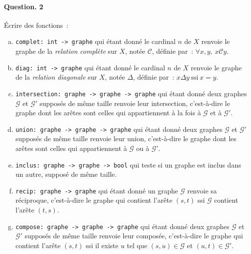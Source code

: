 \documentclass[10pt,a4paper]{article}
\begin{document}
\paragraph{Question. 2\\}
Écrire des fonctions~:
\begin{enumerate}[a)]
\item \texttt{complet: int -> graphe} qui étant donné le cardinal $n$ de $X$
renvoie le graphe de la \textit{relation complète} sur $X$, notée $\mathcal{C}$,
définie par~: $\forall x, y, \ x \mathcal{C} y$.
\item \texttt{diag: int -> graphe} qui étant donné le cardinal $n$ de $X$
renvoie le graphe de la \textit{relation diagonale} sur $X$, notée $\Delta$, 
définie par~: $x \Delta y \ \mathrm{ssi} \ x=y$.
\item \texttt{intersection: graphe -> graphe -> graphe} qui étant donné
deux graphes $\mathcal{G}$ et $\mathcal{G'}$ supposés de même taille renvoie leur 
intersection, c'est-à-dire le graphe dont les arêtes sont celles qui appartiennent
à la fois à $\mathcal{G}$ et à $\mathcal{G'}$.
\item \texttt{union: graphe -> graphe -> graphe} qui étant donné
deux graphes $\mathcal{G}$ et $\mathcal{G'}$ supposés de même taille renvoie leur 
union, c'est-à-dire le graphe dont les arêtes sont celles qui appartiennent à
$\mathcal{G}$ ou à $\mathcal{G'}$.
\item \texttt{inclus: graphe -> graphe -> bool} qui teste si un graphe
est inclus dans un autre, supposé de même taille.
\item \texttt{recip: graphe -> graphe} qui étant donné un graphe 
$\mathcal{G}$ renvoie sa réciproque, c'est-à-dire le graphe qui contient l'arête 
$(s,t)$ ssi $\mathcal{G}$ contient l'arête $(t,s)$.
\item \texttt{compose: graphe -> graphe -> graphe} qui étant donné 
deux graphes $\mathcal{G}$ et $\mathcal{G'}$ supposés de même taille renvoie leur 
composée, c'est-à-dire le graphe qui contient l'arête $(s,t)$ ssi il existe 
$u$ tel que $(s,u)\in \mathcal{G}$ et $(u,t) \in \mathcal{G'}$.
\end{enumerate}
\end{document}
